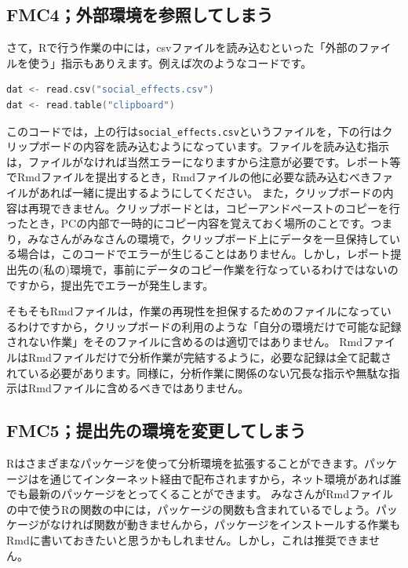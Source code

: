 \documentclass{ltjsbook}
\begin{document}
\subsection{FMC4；外部環境を参照してしまう}

さて，Rで行う作業の中には，csvファイルを読み込むといった「外部のファイルを使う」指示もありえます。例えば次のようなコードです。
\begin{lstlisting}[language=c++,label={code:faq_01},caption={Rmd中のRコードが外部環境を参照してしまう}]
dat <- read.csv("social_effects.csv")
dat <- read.table("clipboard")
\end{lstlisting}

このコードでは，上の行は\verb|social_effects.csv|というファイルを，下の行はクリップボードの内容を読み込むようになっています。ファイルを読み込む指示は，ファイルがなければ当然エラーになりますから注意が必要です。レポート等でRmdファイルを提出するとき，Rmdファイルの他に必要な読み込むべきファイルがあれば一緒に提出するようにしてください。
また，クリップボードの内容は再現できません。クリップボードとは，コピーアンドペーストのコピーを行ったとき，PCの内部で一時的にコピー内容を覚えておく場所のことです。つまり，みなさんがみなさんの環境で，クリップボード上にデータを一旦保持している場合は，このコードでエラーが生じることはありません。しかし，レポート提出先の(私の)環境で，事前にデータのコピー作業を行なっているわけではないのですから，提出先でエラーが発生します。

そもそもRmdファイルは，作業の再現性を担保するためのファイルになっているわけですから，クリップボードの利用のような「自分の環境だけで可能な記録されない作業」をそのファイルに含めるのは適切ではありません。
RmdファイルはRmdファイルだけで分析作業が完結するように，必要な記録は全て記載されている必要があります。同様に，分析作業に関係のない冗長な指示や無駄な指示はRmdファイルに含めるべきではありません。

\subsection{FMC5；提出先の環境を変更してしまう}

Rはさまざまなパッケージを使って分析環境を拡張することができます。パッケージはを通じてインターネット経由で配布されますから，ネット環境があれば誰でも最新のパッケージをとってくることができます。
みなさんがRmdファイルの中で使うRの関数の中には，パッケージの関数も含まれているでしょう。パッケージがなければ関数が動きませんから，パッケージをインストールする作業もRmdに書いておきたいと思うかもしれません。しかし，これは推奨できません。
\end{document}

